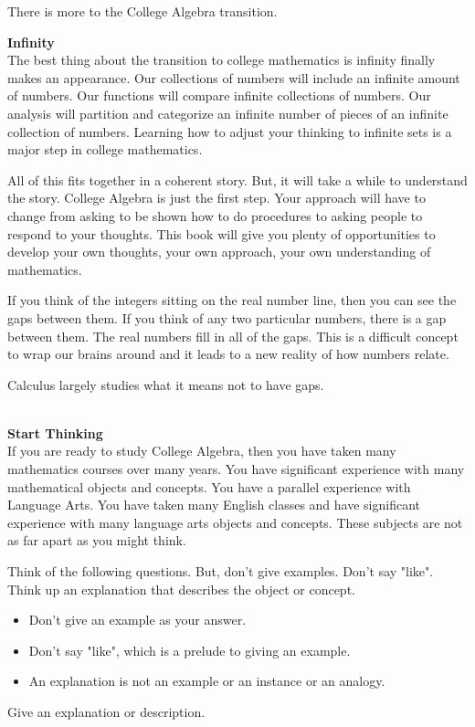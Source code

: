 \documentclass{ximera}
\begin{document}
There is more to the College Algebra transition.




\textbf{Infinity} \\
The best thing about the transition to college mathematics is infinity finally makes an appearance. Our collections of numbers will include an infinite amount of numbers. Our functions will compare infinite collections of numbers. Our analysis will partition and categorize an infinite number of pieces of an infinite collection of numbers. Learning how to adjust your thinking to infinite sets is a major step in college mathematics.

All of this fits together in a coherent story. But, it will take a while to understand the story.  College Algebra is just the first step. Your approach will have to change from asking to be shown how to do procedures to asking people to respond to your thoughts. This book will give you plenty of opportunities to develop your own thoughts, your own approach, your own understanding of mathematics.




\begin{idea}
If you think of the integers sitting on the real number line, then you can see the gaps between them. If you think of any two particular numbers, there is a gap between them. The real numbers fill in all of the gaps.  This is a difficult concept to wrap our brains around and it leads to a new reality of how numbers relate.

Calculus largely studies what it means not to have gaps.  

\end{idea}







\\



\textbf{Start Thinking} \\
If you are ready to study College Algebra, then you have taken many mathematics courses over many years. You have significant experience with many mathematical objects and concepts. You have a parallel experience with Language Arts.  You have taken many English classes and have significant experience with many language arts objects and concepts. These subjects are not as far apart as you might think.

Think of the following questions. But, don't give examples. Don't say "like". Think up an explanation that describes the object or concept.  
\begin{itemize}
\item Don't give an example as your answer.
\item Don't say "like", which is a prelude to giving an example.
\item An explanation is not an example or an instance or an analogy.
\end{itemize}
Give an explanation or description.
\end{document}
